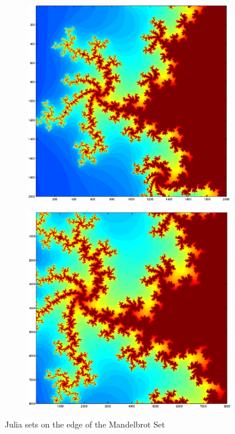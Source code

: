 \documentclass[a4wide, 10pt]{article}
\begin{document}
\begin{figure}[H]
\begin{subfigure}[b]{0.24\textwidth}
                \includegraphics[width=\textwidth]{EPSFiles/MandelbrotZoom2}
                \label{fig:Zoom2}
        \end{subfigure}       
        \begin{subfigure}[b]{0.24\textwidth}
                \includegraphics[width=\textwidth]{EPSFiles/MandelbrotZoom3}
                \label{fig:Zoom3}
        \end{subfigure}        
        \caption{Julia sets on the edge of the Mandelbrot Set}
\end{figure}
\end{document}
